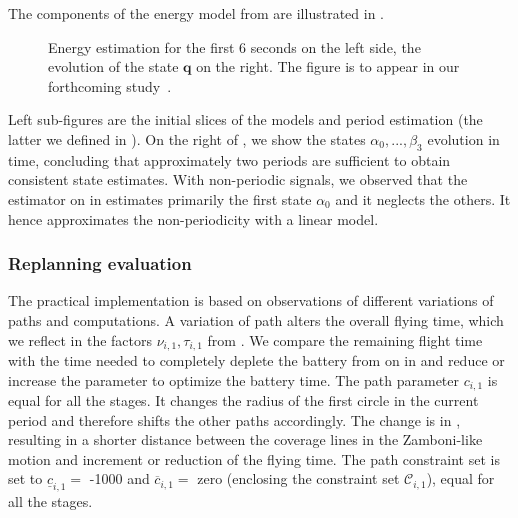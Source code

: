 The components of the energy model from  are illustrated in . 
\begin{figure}[h!]
  \centering
  \selectfont
  \footnotesize    
  
  \caption[Energy estimation and evolution of the state]{Energy estimation for the first 6 seconds on the left side, the evolution of the state $\mathbf{q}$ on the right. The figure is to appear in our forthcoming study~\citep{seewald202Xenergy}.}
  \label{fig:evols-revised}
\end{figure}
Left sub-figures are the initial slices of the models and period estimation (the latter we defined in ). On the right of , we show the states $\alpha_0,...,\beta_3$ evolution in time, concluding that approximately two periods are sufficient to obtain consistent state estimates. With non-periodic signals, we observed that the estimator on  in  estimates primarily the first state $\alpha_0$ and it neglects the others. It hence approximates the non-periodicity with a linear model.

\subsubsection*{Replanning evaluation}

The practical implementation is based on observations of different variations of paths and computations. A variation of path alters the overall flying time, which we reflect in the factors $\nu_{i,1},\tau_{i,1}$ from . We compare the remaining flight time with the time needed to completely deplete the battery from  on  in  and reduce or increase the parameter to optimize the battery time. The path parameter $c_{i,1}$ is equal for all the stages. It changes the radius of the first circle in the current period and therefore shifts the other paths accordingly. The change is in , resulting in a shorter distance between the coverage lines in the Zamboni-like motion and increment or reduction of the flying time. The path constraint set is set to $\underline{c}_{i,1}=$ -1000 and $\overline{c}_{i,1}=$ zero (enclosing the constraint set $\mathcal{C}_{i,1}$), equal for all the stages.

